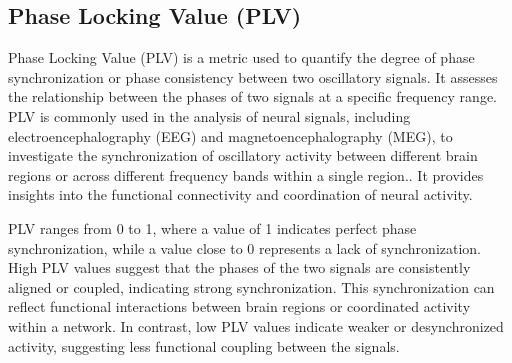 \documentclass[12pt]{article}
\begin{document}
\clearpage
\newpage

\subsection{Phase Locking Value (PLV)}
\label{sec:3.4}
Phase Locking Value (PLV) is a metric used to quantify the degree of phase synchronization or phase consistency between two oscillatory signals. It assesses the relationship between the phases of two signals at a specific frequency range. PLV is commonly used in the analysis of neural signals, including electroencephalography (EEG) and magnetoencephalography (MEG), to investigate the synchronization of oscillatory activity between different brain regions or across different frequency bands within a single region.. It provides insights into the functional connectivity and coordination of neural activity. \par

\medskip
PLV ranges from 0 to 1, where a value of 1 indicates perfect phase synchronization, while a value close to 0 represents a lack of synchronization. High PLV values suggest that the phases of the two signals are consistently aligned or coupled, indicating strong synchronization. This synchronization can reflect functional interactions between brain regions or coordinated activity within a network. In contrast, low PLV values indicate weaker or desynchronized activity, suggesting less functional coupling between the signals.\par
\end{document}
